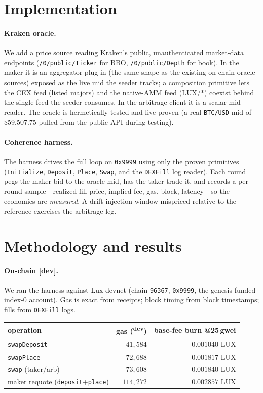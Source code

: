 \documentclass[11pt,a4paper]{article}
\newcommand{\dev}{\textsuperscript{\textsf{\scriptsize dev}}}
\begin{document}
\section{Implementation}\label{sec:impl}

\paragraph{Kraken oracle.} We add a price source reading Kraken's public, unauthenticated
market-data endpoints (\texttt{/0/public/Ticker} for BBO, \texttt{/0/public/Depth} for
book). In the maker it is an aggregator plug-in (the same shape as the existing on-chain
oracle sources) exposed as the live mid the seeder tracks; a composition primitive lets
the CEX feed (listed majors) and the native-AMM feed (LUX/\(*\)) coexist behind the
single feed the seeder consumes. In the arbitrage client it is a scalar-mid reader. The
oracle is hermetically tested and live-proven (a real \texttt{BTC/USD} mid of
\$59{,}507.75 pulled from the public API during testing).

\paragraph{Coherence harness.} The harness drives the full loop on \texttt{0x9999} using
only the proven primitives (\texttt{Initialize}, \texttt{Deposit}, \texttt{Place},
\texttt{Swap}, and the \texttt{DEXFill} log reader). Each round pegs the maker bid to the
oracle mid, has the taker trade it, and records a per-round sample---realized fill price,
implied fee, gas, block, latency---so the economics are \emph{measured}. A drift-injection
window mispriced relative to the reference exercises the arbitrage leg.

\section{Methodology and results}\label{sec:results}

\paragraph{On-chain [dev].} We ran the harness against Lux devnet (chain \texttt{96367},
\texttt{0x9999}, the genesis-funded index-0 account). Gas is exact from receipts; block
timing from block timestamps; fills from \texttt{DEXFill} logs.

\begin{center}
\begin{tabular}{@{}lrr@{}}
\toprule
operation & gas (\dev) & base-fee burn @25\,gwei \\
\midrule
\texttt{swapDeposit} & $41{,}584$ & $0.001040$ LUX \\
\texttt{swapPlace}   & $72{,}688$ & $0.001817$ LUX \\
\texttt{swap} (taker/arb) & $73{,}608$ & $0.001840$ LUX \\
maker requote (\texttt{deposit}+\texttt{place}) & $114{,}272$ & $0.002857$ LUX \\
\bottomrule
\end{tabular}
\end{center}
\end{document}
